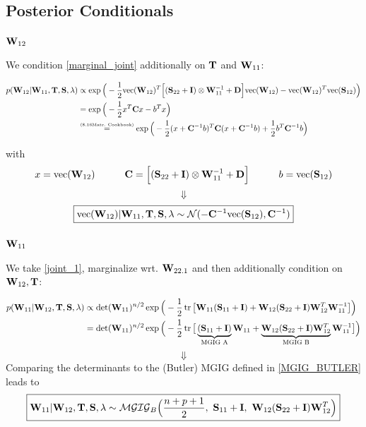 \subsection{Posterior Conditionals}
\label{A:post_cond}
\subsubsection{$\mathbf{W}_{12}$}
We condition \autoref{marginal_joint} additionally on $\mathbf{T}$ and $\mathbf{W}_{11}$:

\begin{align*}
p(\mathbf{W}_{12} | \mathbf{W}_{11}, \mathbf{T}, \mathbf{S}, \lambda)
&\propto 
\exp\Big(
-\frac{1}{2}\text{vec}(\mathbf{W}_{12})^T \Big[
(\mathbf{S}_{22} + \mathbf{I}) \otimes \mathbf{W}_{11}^{-1} +\mathbf{D}\Big]
\text{vec}(\mathbf{W}_{12})
- \text{vec}(\mathbf{W}_{12})^T \text{vec}(\mathbf{S}_{12})
\Big)
\\
&=\exp\Big(-\frac{1}{2} x^T\mathbf{C}x - b^Tx\Big) 
\\
&\overset{\text{\tiny{(8.16Matr. Cookbook)}}}{=}
\exp \Big(-\frac{1}{2} (x+\mathbf{C}^{-1}b)^T\mathbf{C}(x+\mathbf{C}^{-1}b) + \frac{1}{2}b^T\mathbf{C}^{-1}b\Big)
\end{align*}

with 
$$
x = \text{vec}(\mathbf{W}_{12})
\quad \quad \quad
\mathbf{C} = \Big[
(\mathbf{S}_{22} + \mathbf{I}) \otimes \mathbf{W}_{11}^{-1} +\mathbf{D}\Big]
\quad \quad \quad
b = \text{vec}(\mathbf{S}_{12})
$$
$$\Downarrow$$
\begin{equation}
	\boxed{
		\text{vec}(\mathbf{W}_{12}) | \mathbf{W}_{11}, \mathbf{T}, \mathbf{S}, \lambda \sim \mathcal{N}(-\mathbf{C}^{-1} \text{vec}(\mathbf{S}_{12}), \mathbf{C}^{-1})
	}
\end{equation}

\subsubsection{$\mathbf{W}_{11}$}
We take \autoref{joint_1}, marginalize wrt. $\mathbf{W}_{22.1}$ and then additionally condition on $ \mathbf{W}_{12}, \mathbf{T}$:

\begin{align*}
p(\mathbf{W}_{11} | \mathbf{W}_{12}, \mathbf{T}, \mathbf{S}, \lambda)
& \propto
\det(\mathbf{W}_{11})^{n/2}
\exp \Big(
-\frac{1}{2} \operatorname{tr}\big[
\mathbf{W}_{11}(\mathbf{S}_{11}+ \mathbf{I}) + \mathbf{W}_{12}(\mathbf{S}_{22}+\mathbf{I})\mathbf{W}_{12}^T \mathbf{W}_{11}^{-1}
\big]
\Big)
\\
&=
\det(\mathbf{W}_{11})^{n/2}
\exp \Big(
-\frac{1}{2} \operatorname{tr}\big[
\underbrace{(\mathbf{S}_{11}+ \mathbf{I})}_{\text{MGIG A}} \mathbf{W}_{11}+ \underbrace{\mathbf{W}_{12}(\mathbf{S}_{22}+\mathbf{I})\mathbf{W}_{12}^T}_{\text{MGIG B}}\mathbf{W}_{11}^{-1}
\big]
\Big)
\end{align*}
$$\Downarrow$$
Comparing the determinants to the (Butler) \gls{MGIG} defined in \autoref{MGIG_BUTLER} leads to
\begin{equation}
\label{W11_MGIG_posterior}
\boxed{
	\matr{W}_{11} | \matr{W}_{12}, \matr{T}, \matr{S}, \lambda \sim 
	\mathcal{MGIG}_B
	\Big(
		\frac{n+p+1}{2}, \ 
		\matr{S}_{11}+\matr{I},\  
		\matr{W}_{12}(\matr{S}_{22}+\matr{I})\matr{W}_{12}^T
	\Big)
}
\end{equation}

